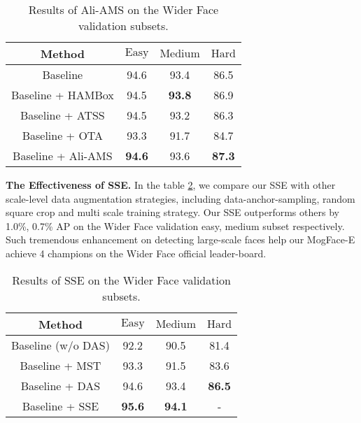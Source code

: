 \documentclass[10pt,twocolumn,letterpaper]{article}
\begin{document}
\begin{table}[h]
\small
\renewcommand\arraystretch{1.1}
	\begin{center}
	\setlength{\tabcolsep}{10pt}
	\begin{tabular}{c|ccc}
		\hline
		Method   & $\text{Easy}$  & $\text{Medium}$ & $\text{Hard}$ \\
		\hline
        Baseline  &94.6  &93.4 & 86.5 \\
        Baseline + HAMBox  &94.5  &\textbf{93.8} & 86.9 \\
        Baseline + ATSS &94.5	&93.2	&86.3 \\
        Baseline + OTA &93.3  &91.7 & 84.7 \\
        Baseline + Ali-AMS  &\textbf{94.6}  &93.6 & \textbf{87.3}\\   
		\hline				
	\end{tabular}
	\end{center}
\vspace{-10pt}
\caption{Results of Ali-AMS on the Wider Face validation subsets.
}
\label{table_5}
\end{table}
\noindent\textbf{The Effectiveness of SSE.} In the table \ref{table_6}, we compare our SSE with other scale-level data augmentation strategies, including data-anchor-sampling, random square crop and multi scale training strategy. Our SSE outperforms others by 1.0\%, 0.7\% AP on the Wider Face validation easy, medium subset respectively. Such tremendous enhancement on detecting large-scale faces help our MogFace-E achieve 4 champions on the Wider Face official leader-board.
\begin{table}[h]
\small
\renewcommand\arraystretch{1.1}
	\begin{center}
	\setlength{\tabcolsep}{10pt}
	\begin{tabular}{c|ccc}
		\hline
		Method   & $\text{Easy}$  & $\text{Medium}$ & $\text{Hard}$ \\
		\hline
        Baseline (w/o DAS)  &92.2	& 90.5 & 81.4 \\
        Baseline + MST &93.3	& 91.5	&83.6 \\
        Baseline + DAS &94.6  &93.4 & \textbf{86.5} \\
        Baseline + SSE  &\textbf{95.6}  &\textbf{94.1} & - \\   
		\hline				
	\end{tabular}
	\end{center}
\vspace{-10pt}
\caption{Results of SSE on the Wider Face validation subsets.
}
\label{table_6}
\end{table}
\end{document}
